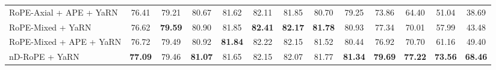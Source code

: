 \documentclass{article}
\theoremstyle{plain}
\theoremstyle{definition}
\theoremstyle{remark}
\begin{document}
\begin{table}[t]
{\begin{tabular}{lcccccccccccc}
RoPE-Axial + APE + YaRN
& 76.41 & 79.21 & 80.67 & 81.62 & 82.11 & 81.85 & 80.70 & 79.25 & 73.86 & 64.40 & 51.04 & 38.69 \\

RoPE-Mixed + YaRN
& 76.62 & \textbf{79.59} & 80.90 & 81.85 & \textbf{82.41} & \textbf{82.17} & \textbf{81.78} & 80.93 & 77.34 & 70.01 & 57.99 & 43.48 \\

RoPE-Mixed + APE + YaRN
& 76.72 & 79.49 & 80.92 & \textbf{81.84} & 82.22 & 82.15 & 81.52 & 80.44 & 76.92 & 70.70 & 61.16 & 49.40 \\

nD-RoPE + YaRN
& \textbf{77.09}
& 79.46
& \textbf{81.07}
& 81.65
& 82.15
& 82.07
& 81.77
& \textbf{81.34}
& \textbf{79.69}
& \textbf{77.22}
& \textbf{73.56}
& \textbf{68.46} \\
\bottomrule
\end{tabular}
}
\end{table}
\end{document}

